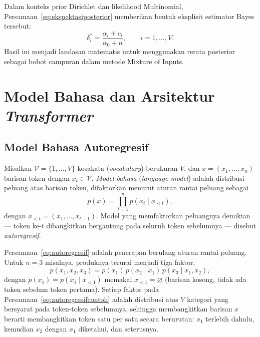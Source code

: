 Dalam konteks prior Dirichlet dan likelihood Multinomial,
Persamaan~\eqref{eq:ekspektasiposterior} memberikan bentuk
eksplisit estimator Bayes tersebut:
\begin{equation}
\delta_i^*
=
\frac{\alpha_i+c_i}{\alpha_0+n},
\qquad i=1,\ldots,V.
\label{eq:estimatorbayesdirichlet}
\end{equation}
Hasil ini menjadi landasan matematis untuk menggunakan rerata
posterior sebagai bobot campuran dalam metode Mixture of Inputs.



\section{Model Bahasa dan Arsitektur \textit{Transformer}}
\label{sec:transformer}

\subsection{Model Bahasa Autoregresif}
\label{subsec:autoregresif}

\begin{definisi}
\label{def:modelbahasa}
Misalkan $\mathcal{V}=\{1,\dots,V\}$ kosakata (\textit{vocabulary})
berukuran $V$, dan $x=(x_1,\dots,x_n)$ barisan token dengan $x_t\in
\mathcal{V}$. \textit{Model bahasa} (\textit{language model}) adalah
distribusi peluang atas barisan token, difaktorkan menurut aturan rantai
peluang sebagai
\begin{equation}
  p(x) = \prod_{t=1}^{n} p(x_t \mid x_{<t}),
  \label{eq:autoregresif}
\end{equation}
dengan $x_{<t}=(x_1,\dots,x_{t-1})$. Model yang memfaktorkan peluangnya
demikian --- token ke-$t$ dibangkitkan bergantung pada seluruh token
sebelumnya --- disebut \textit{autoregresif}.
\end{definisi}

Persamaan~\eqref{eq:autoregresif} adalah penerapan berulang aturan rantai
peluang. Untuk $n=3$ misalnya, produknya terurai menjadi tiga faktor,
\begin{equation}
  p(x_1,x_2,x_3) = p(x_1)\,p(x_2\mid x_1)\,p(x_3\mid x_1,x_2),
  \label{eq:autoregresifcontoh}
\end{equation}
dengan $p(x_1)=p(x_1\mid x_{<1})$ memakai $x_{<1}=\varnothing$ (barisan
kosong, tidak ada token sebelum token pertama). Setiap faktor pada
Persamaan~\eqref{eq:autoregresifcontoh} adalah distribusi atas $V$
kategori yang bersyarat pada token-token sebelumnya, sehingga membangkitkan
barisan $x$ berarti membangkitkan token satu per satu secara berurutan:
$x_1$ terlebih dahulu, kemudian $x_2$ dengan $x_1$ diketahui, dan
seterusnya.


